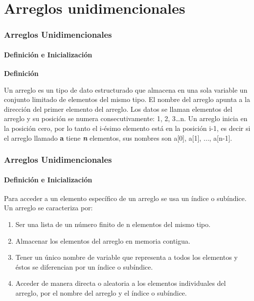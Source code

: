 \section*{Arreglos unidimencionales}
\begin{frame}
    \frametitle{Arreglos Unidimencionales}
    \framesubtitle{Definición e Inicialización}
    \begin{center}
        \textbf{Definición}
    \end{center}
    \justify
    \hspace{5mm}Un arreglo es un tipo de dato estructurado que almacena en una sola variable un conjunto limitado de elementos del mismo tipo. El nombre del arreglo apunta a la dirección del primer elemento del arreglo. Los datos se llaman elementos del arreglo y su posición se numera consecutivamente: 1, 2, 3…n. Un arreglo inicia en la posición cero, por lo tanto el i-ésimo elemento está en la posición i-1, es decir si el arreglo llamado \textbf{a} tiene \textbf{\textit{n}} elementos, sus nombres son a[0], a[1], ..., a[n-1].\\
\end{frame}


\begin{frame}
\frametitle{Arreglos Unidimencionales}
\framesubtitle{Definición e Inicialización}
    \justify
    Para acceder a un elemento específico de un arreglo se usa un índice o subíndice.
    Un arreglo se caracteriza por:
    \begin{enumerate}
        \item Ser una lista de un número finito de n elementos del mismo tipo.
        \item Almacenar los elementos del arreglo en memoria contigua.
        \item Tener un único nombre de variable que representa a todos los elementos y éstos se diferencian por un índice o subíndice.
        \item Acceder de manera directa o aleatoria a los elementos individuales del arreglo, por el nombre del arreglo y el índice o subíndice.
    \end{enumerate}
\end{frame}


